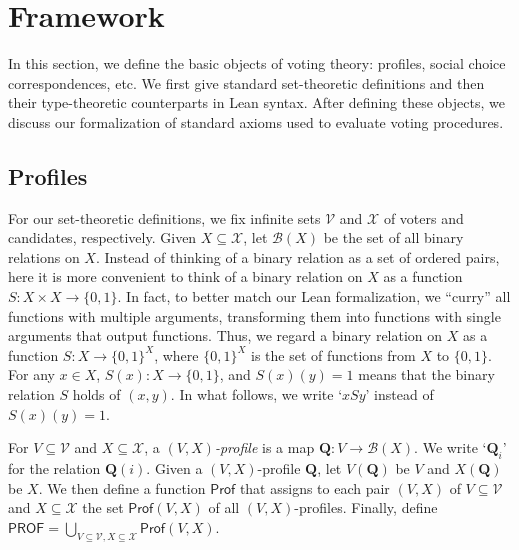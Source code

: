 \documentclass[runningheads]{llncs}
\begin{document}

 
\section{Framework}\label{Framework}

In this section, we define the basic objects of voting theory: profiles, social choice correspondences, etc. We first give standard set-theoretic definitions and then their type-theoretic counterparts in Lean syntax. After defining these objects, we discuss our formalization of standard axioms used to evaluate voting procedures.

\subsection{Profiles}

For our set-theoretic definitions, we fix infinite sets $\mathcal{V}$ and $\mathcal{X}$ of voters and candidates, respectively. Given $X\subseteq\mathcal{X}$, let $\mathcal{B}(X)$ be the set of all binary relations on $X$. Instead of thinking of a binary relation as a set of ordered pairs, here it is more convenient to think of a binary relation on $X$ as a function $S: X\times X \to \{0,1\}$. In fact, to better match our Lean formalization, we ``curry'' all functions with multiple arguments, transforming them into functions with single arguments that output functions. Thus, we regard a binary relation on $X$ as a function  $S:X\to \{0,1\}^X$, where $\{0,1\}^X$ is the set of functions from $X$ to $\{0,1\}$. For any $x\in X$, $S(x): X\to \{0,1\}$, and $S(x)(y)=1$ means that the binary relation $S$ holds of $(x,y)$. In what follows, we write `$xSy$' instead of $S(x)(y)=1$.


\begin{definition}\label{ProfileDef} \textnormal{For $V\subseteq\mathcal{V}$ and $X\subseteq\mathcal{X}$, a \emph{$(V,X)$-profile} is a map $\mathbf{Q}:V\to \mathcal{B}(X)$. We write `$\mathbf{Q}_i$' for the relation $\mathbf{Q}(i)$. Given a $(V,X)$-profile $\mathbf{Q}$, let $V(\mathbf{Q})$ be $V$ and $X(\mathbf{Q})$  be $X$. We then define a function $\mathsf{Prof}$ that assigns to each pair $(V,X)$ of $V\subseteq\mathcal{V}$ and $X\subseteq\mathcal{X}$ the set $\mathsf{Prof}(V,X)$ of all $(V,X)$-profiles. Finally, define $\mathsf{PROF} = \bigcup_{V\subseteq\mathcal{V},X\subseteq\mathcal{X}}\mathsf{Prof}(V,X)$.}\end{definition}
\end{document}
